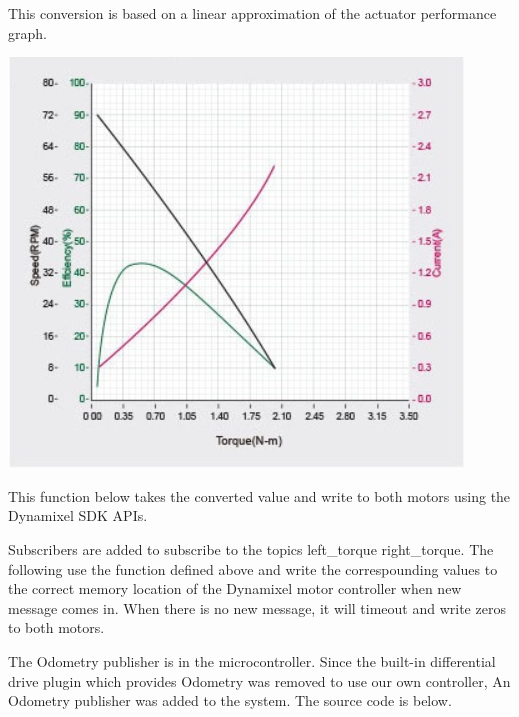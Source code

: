 \documentclass[12]{article}
\begin{document}
This conversion is based on a linear approximation of the actuator performance graph.

\begin{center}
	\includegraphics[width=\linewidth]{images/xm430_performance.png}\\
\end{center}

This function below takes the converted value and write to both motors using the Dynamixel SDK APIs. 


Subscribers are added to subscribe to the topics \/left\_torque \/right\_torque. 
The following use the function defined above and write the correspounding values to the correct memory location of the Dynamixel motor controller when new message comes in. 
When there is no new message, it will timeout and write zeros to both motors. 



The Odometry publisher is in the microcontroller. Since the built-in differential drive plugin which provides Odometry was removed to use our own controller,
An Odometry publisher was added to the system. The source code is below. 


\end{document}
